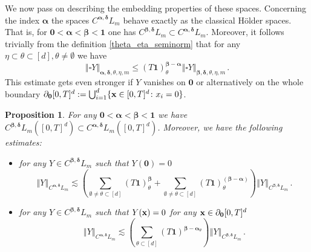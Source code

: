 \documentclass[12pt]{article}
\numberwithin{equation}{section}
\theoremstyle{plain}
\newtheorem{proposition}[theorem]{Proposition}
\theoremstyle{definition}
\newcommand{\norm}[1]{\left\Vert #1\right\Vert}
\def\falpha{{\boldsymbol\alpha}}
\def\fbeta{{\boldsymbol\beta}}
\def\fdelta{{\boldsymbol\delta}}
\def\foo{{\boldsymbol 0}}
\def\fone{{\boldsymbol 1}}
\begin{document}
We now pass on describing the embedding properties of these spaces. Concerning the index  $\falpha$ the spaces $C^{\falpha,\fdelta}L_m $ behave exactly as the classical H\"older spaces. That is, for $\foo < \falpha <\fbeta <\mathbf 1$ one  has $C^{\fbeta,\fdelta} L_m \subset C^{\falpha,\fdelta} L_m$. Moreover, it follows trivially from the definition \eqref{theta_eta_seminorm} that for any $\eta\subset\theta\subset[d],\theta\neq\emptyset$ we have
\begin{equation}\label{ineq:CalphaEmbedding0}
    \norm{\square Y}_{\falpha,\fdelta,\theta,\eta,m} \le (T\mathbf{1})^{\fbeta-\falpha}_\theta\norm{\square Y}_{\fbeta,\fdelta,\theta,\eta,m}\,.
\end{equation}
This estimate gets even stronger if $Y$ vanishes on $\foo$ or alternatively  on the whole boundary $\partial_{\foo} [0,T]^d := \bigcup_{i=1}^{d}\{\fx\in[0,T]^d\colon  x_i = 0\}$.
\begin{proposition}\label{prop:CalphaEmbedding}
    For any $\foo < \falpha <\fbeta <\mathbf 1$ we have $C^{\fbeta,\fdelta}L_m([0,T]^d)\subset C^{\falpha,\fdelta}L_m([0,T]^d)$. Moreover, we have the following estimates:
    \begin{itemize}
        \item for any $Y\in C^{\fbeta,\fdelta}L_m$ such that $Y(\foo)=0$
        \begin{equation}\label{ineq:CalphaEmbedding1}
            \norm{Y}_{C^{\falpha,\fdelta}L_m}\lesssim \left(\sum_{\emptyset\neq\theta\subset[d]}(T\fone)^{\fbeta}_{\theta}+ \sum_{\emptyset\neq\theta\subset[d]} (T\mathbf{1})^{(\fbeta-\falpha)}_\theta\right)\norm{Y}_{C^{\fbeta,\fdelta} L_m}\,.
        \end{equation}

        \item for any $Y\in C^{\fbeta,\fdelta}L_m$ such that $Y(\mathbf x)=0$ for any $\fx\in \partial_{\foo} [0,T]^d$
        \begin{equation}\label{ineq:CalphaEmbedding2}
            \norm{Y}_{C^{\falpha,\fdelta}L_m}\lesssim \left(\sum_{\theta\subset[d]}(T\mathbf{1})^{\fbeta-\falpha_\theta}\right)\norm{Y}_{C^{\fbeta,\fdelta}L_m}\,.
        \end{equation}
    \end{itemize}
\end{proposition}
\end{document}
